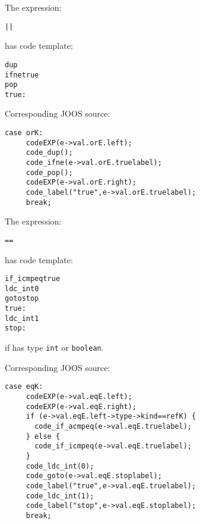 \begin{slide*}
The expression:
 
\begin{scriptsize}
\begin{alltt}
      || 
\end{alltt}
\end{scriptsize}
 
has code template:
 
\begin{scriptsize}
\begin{alltt}
    dup
    ifne true
    pop
    true:
\end{alltt}
\end{scriptsize}
 
Corresponding JOOS source:
 
\begin{scriptsize}
\begin{verbatim}
case orK:
     codeEXP(e->val.orE.left);
     code_dup();
     code_ifne(e->val.orE.truelabel);
     code_pop();
     codeEXP(e->val.orE.right);
     code_label("true",e->val.orE.truelabel);
     break;
\end{verbatim}
\end{scriptsize}
\vfil
\end{slide*}

\begin{slide*}
The expression:
 
\begin{scriptsize}
\begin{alltt}
    == 
\end{alltt}
\end{scriptsize}
 
has code template:
 
\begin{scriptsize}
\begin{alltt}
   if_icmpeq true
   ldc_int 0
   goto stop
   true:
   ldc_int 1
   stop:
\end{alltt}
\end{scriptsize}

if  has type {\tt int} or {\tt boolean}.

Corresponding JOOS source:
 
\begin{scriptsize}
\begin{verbatim}
case eqK:
     codeEXP(e->val.eqE.left);
     codeEXP(e->val.eqE.right);
     if (e->val.eqE.left->type->kind==refK) {
       code_if_acmpeq(e->val.eqE.truelabel);
     } else {
       code_if_icmpeq(e->val.eqE.truelabel);
     }
     code_ldc_int(0);
     code_goto(e->val.eqE.stoplabel);
     code_label("true",e->val.eqE.truelabel);
     code_ldc_int(1);
     code_label("stop",e->val.eqE.stoplabel);
     break;
\end{verbatim}
\end{scriptsize}
\vfil
\end{slide*}


